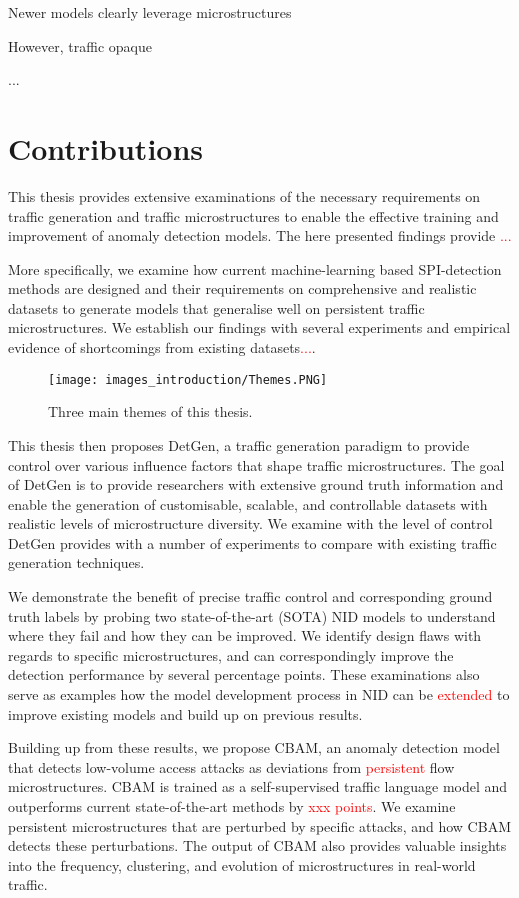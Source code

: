 Newer models clearly leverage microstructures

However, traffic opaque 

...

\section{Contributions}

This thesis provides extensive examinations of the necessary requirements on traffic generation and traffic microstructures to enable the effective training and improvement of anomaly detection models. The here presented findings provide \textcolor{red}{...}

More specifically, we examine how current machine-learning based SPI-detection methods are designed and their requirements on comprehensive and realistic datasets to generate models that generalise well on persistent traffic microstructures. We establish our findings with several experiments and empirical evidence of shortcomings from existing datasets\textcolor{red}{...}.

\begin{figure}
\centering
\texttt{[image: images\_introduction/Themes.PNG]}
\caption{Three main themes of this thesis.}\label{Fig:themes}
\end{figure}

This thesis then proposes DetGen, a traffic generation paradigm to provide control over various influence factors that shape traffic microstructures. The goal of DetGen is to provide researchers with extensive ground truth information and enable the generation of customisable, scalable, and controllable datasets with realistic levels of microstructure diversity. We examine with the level of control DetGen provides with a number of experiments to compare with existing traffic generation techniques. 

We demonstrate the benefit of precise traffic control and corresponding ground truth labels by probing two state-of-the-art (SOTA) NID models to understand where they fail and how they can be improved. We identify design flaws with regards to specific microstructures, and can correspondingly improve the detection performance by several percentage points. These examinations also serve as examples how the model development process in NID can be \textcolor{red}{extended} to improve existing models and build up on previous results.

Building up from these results, we propose CBAM, an anomaly detection model that detects low-volume access attacks as deviations from \textcolor{red}{persistent} flow microstructures. CBAM is trained as a self-supervised traffic language model and outperforms current state-of-the-art methods by \textcolor{red}{xxx points}. We examine persistent microstructures that are perturbed by specific attacks, and how CBAM detects these perturbations. The output of CBAM also provides valuable insights into the frequency, clustering, and evolution of microstructures in real-world traffic.

